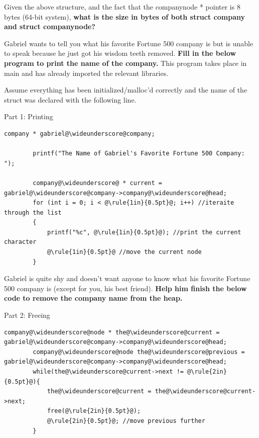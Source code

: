 \documentclass{article}
\newcommand{\wideunderscore}{\underline{\hphantom{n}}}
\begin{document}
\begin{enumerate}[label=(\alph*), itemsep = 120pt]
    Given the above structure, and the fact that the company\wideunderscore node * pointer is 8 bytes (64-bit system),
    \textbf{what is the size in bytes of both struct company and struct company\wideunderscore node?}


    \vspace{2.5cm} %
    
    Gabriel wants to tell you what his favorite Fortune 500 company is but is unable to speak because he just got his wisdom teeth removed. \textbf{Fill in the below program to print the name of the company.} This program takes place in main and has already imported the relevant libraries. 

    Assume everything has been initialized/malloc'd correctly and the name of the struct was declared with the following line. 

    Part 1: Printing

    \begin{lstlisting}[style = CStyle]
        company * gabriel@\wideunderscore@company;

        printf("The Name of Gabriel's Favorite Fortune 500 Company: ");

        company@\wideunderscore@ * current = gabriel@\wideunderscore@company->company@\wideunderscore@head;
        for (int i = 0; i < @\rule{1in}{0.5pt}@; i++) //iteraite through the list
        { 
            printf("%c", @\rule{1in}{0.5pt}@); //print the current character
            @\rule{1in}{0.5pt}@ //move the current node
        }
    \end{lstlisting}
    
    Gabriel is quite shy and doesn't want anyone to know what his favorite Fortune 500 company is (except for you, his best friend). \textbf{Help him finish the below code to remove the company name from the heap.}

    Part 2: Freeing
    \begin{lstlisting}[style = CStyle]
        company@\wideunderscore@node * the@\wideunderscore@current = gabriel@\wideunderscore@company->company@\wideunderscore@head;
        company@\wideunderscore@node the@\wideunderscore@previous = gabriel@\wideunderscore@company->company@\wideunderscore@head;
        while(the@\wideunderscore@current->next != @\rule{2in}{0.5pt}@){
            the@\wideunderscore@current = the@\wideunderscore@current->next;
            free(@\rule{2in}{0.5pt}@);
            @\rule{2in}{0.5pt}@; //move previous further
        }


\end{lstlisting}
\end{enumerate}
\end{document}
